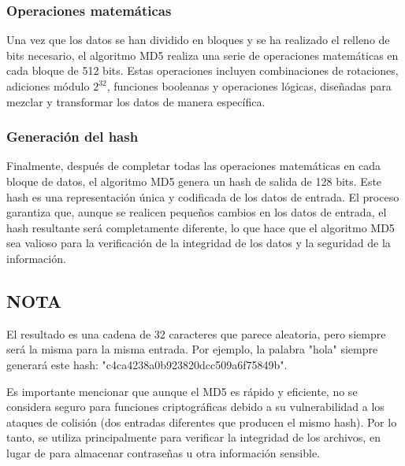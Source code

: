 \subsubsection{Operaciones matemáticas}
Una vez que los datos se han dividido en bloques y se ha realizado el relleno de bits necesario, el algoritmo MD5 realiza una serie de operaciones matemáticas en cada bloque de 512 bits. Estas operaciones incluyen combinaciones de rotaciones, adiciones módulo $2^{32}$, funciones booleanas y operaciones lógicas, diseñadas para mezclar y transformar los datos de manera específica.
\subsubsection{Generación del hash}
Finalmente, después de completar todas las operaciones matemáticas en cada bloque de datos, el algoritmo MD5 genera un hash de salida de 128 bits. Este hash es una representación única y codificada de los datos de entrada. El proceso garantiza que, aunque se realicen pequeños cambios en los datos de entrada, el hash resultante será completamente diferente, lo que hace que el algoritmo MD5 sea valioso para la verificación de la integridad de los datos y la seguridad de la información.

\subsection{NOTA}
El resultado es una cadena de 32 caracteres que parece aleatoria, pero siempre será la misma para la misma entrada. Por ejemplo, la palabra "hola" siempre generará este hash: "c4ca4238a0b923820dcc509a6f75849b".

Es importante mencionar que aunque el MD5 es rápido y eficiente, no se considera seguro para funciones criptográficas debido a su vulnerabilidad a los ataques de colisión (dos entradas diferentes que producen el mismo hash). Por lo tanto, se utiliza principalmente para verificar la integridad de los archivos, en lugar de para almacenar contraseñas u otra información sensible.